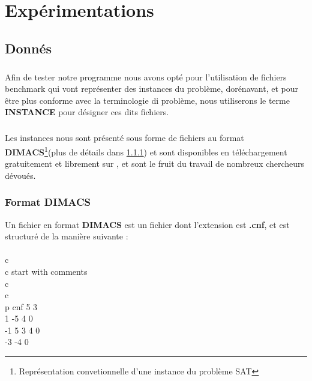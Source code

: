 \chapter{Expérimentations}
\section{Donnés}\label{dataSet}
\paragraph{}Afin de tester notre programme nous avons opté pour l'utilisation de fichiers benchmark qui vont représenter des instances du problème, dorénavant, et pour être plus conforme avec la terminologie di problème, nous utiliserons le terme \textbf{INSTANCE} pour désigner ces dits fichiers.
\paragraph{}
Les instances nous sont présenté sous forme de fichiers au format \textbf{DIMACS}\footnote{Représentation convetionnelle d'une instance du problème SAT}(plus de détails dans \ref{par:dimacs}) et sont disponibles en téléchargement gratuitement et librement sur \cite{Benchmark}, et sont le fruit du travail de nombreux chercheurs dévoués.
\subsection{Format DIMACS}\label{par:dimacs}
Un fichier en format \textbf{DIMACS} est un fichier dont l'extension est \textbf{.cnf}, et est structuré de la manière suivante : \\\\ 
c\\
c start with comments\\
c\\
c \\

p cnf 5 3\\

1 -5 4 0\\
-1 5 3 4 0\\
-3 -4 0\\
\newpage
